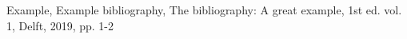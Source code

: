 \documentclass[letterpaper, 10 pt, conference]{ieeeconf}  %
\begin{document}









\begin{thebibliography}{99}

 Example, Example bibliography, The bibliography: A great example, 1st ed. vol. 1, Delft, 2019, pp. 1-2


\end{thebibliography}
\end{document}
